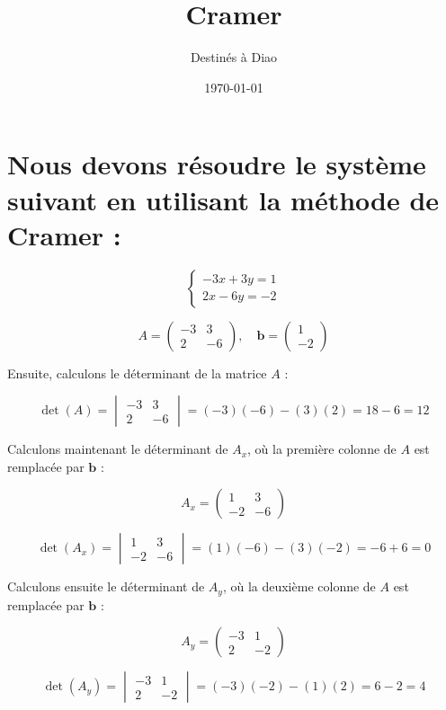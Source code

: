 \documentclass[12pt]{article}
\author{Destinés à Diao}
\title{\textbf{Cramer}}
\date{\today}
\begin{document}
\maketitle
\newpage

\section*{Nous devons résoudre le système suivant en utilisant la méthode de Cramer :}

\[
\begin{cases}
-3x + 3y = 1 \\
2x - 6y = -2
\end{cases}
\]


\[
A = \begin{pmatrix}
-3 & 3 \\
2 & -6
\end{pmatrix}, \quad
\mathbf{b} = \begin{pmatrix}
1 \\
-2
\end{pmatrix}
\]

Ensuite, calculons le déterminant de la matrice $A$ :

\[
\det(A) = \begin{vmatrix}
-3 & 3 \\
2 & -6
\end{vmatrix} = (-3)(-6) - (3)(2) = 18 - 6 = 12
\]

Calculons maintenant le déterminant de $A_x$, où la première colonne de $A$ est remplacée par $\mathbf{b}$ :

\[
A_x = \begin{pmatrix}
1 & 3 \\
-2 & -6
\end{pmatrix}
\]

\[
\det(A_x) = \begin{vmatrix}
1 & 3 \\
-2 & -6
\end{vmatrix} = (1)(-6) - (3)(-2) = -6 + 6 = 0
\]

Calculons ensuite le déterminant de $A_y$, où la deuxième colonne de $A$ est remplacée par $\mathbf{b}$ :

\[
A_y = \begin{pmatrix}
-3 & 1 \\
2 & -2
\end{pmatrix}
\]

\[
\det(A_y) = \begin{vmatrix}
-3 & 1 \\
2 & -2
\end{vmatrix} = (-3)(-2) - (1)(2) = 6 - 2 = 4
\]
\end{document}
